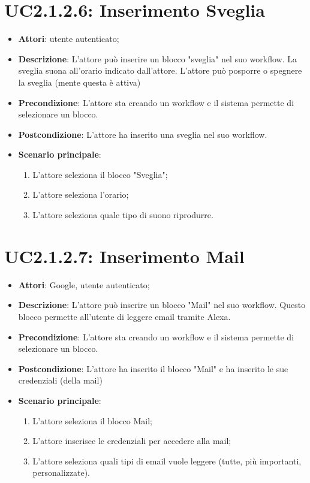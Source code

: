 \section{UC2.1.2.6: Inserimento Sveglia}
\label{UC2.1.2.6}
\begin{itemize}
	\item \textbf{Attori}: utente autenticato;
	\item \textbf{Descrizione}: L'attore può inserire un blocco "sveglia" nel suo workflow. La sveglia suona all'orario indicato dall'attore. L'attore può posporre o spegnere la sveglia (mente questa è attiva)
	\item \textbf{Precondizione}: L'attore sta creando un workflow e il sistema permette di selezionare un blocco.
	\item \textbf{Postcondizione}: L'attore ha inserito una sveglia nel suo workflow.
	\item \textbf{Scenario principale}:
	\begin{enumerate} \item L'attore seleziona il blocco "Sveglia";  \item  L'attore seleziona l'orario;  \item  L'attore seleziona quale tipo di suono riprodurre.\end{enumerate}
\end{itemize}

\section{UC2.1.2.7: Inserimento Mail}
\label{UC2.1.2.7}
\begin{itemize}
	\item \textbf{Attori}: Google, utente autenticato;
	\item \textbf{Descrizione}: L'attore può inserire un blocco "Mail" nel suo workflow. Questo blocco permette all'utente di leggere email tramite Alexa.
	\item \textbf{Precondizione}: L'attore sta creando un workflow e il sistema permette di selezionare un blocco.
	\item \textbf{Postcondizione}: L'attore ha inserito il blocco "Mail" e ha inserito le sue credenziali (della mail)
	\item \textbf{Scenario principale}:
	\begin{enumerate} \item L'attore seleziona il blocco Mail;  \item  L'attore inserisce le credenziali per accedere alla mail;  \item  L'attore seleziona quali tipi di email vuole leggere (tutte, più importanti, personalizzate).\end{enumerate}
\end{itemize}

